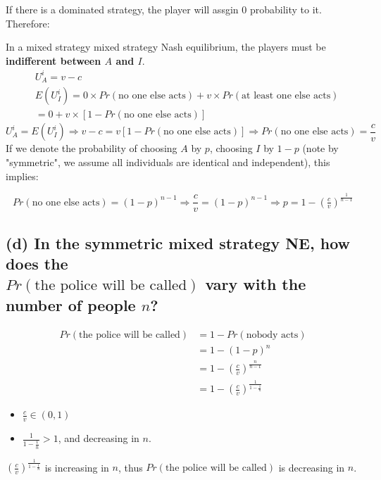 \documentclass{article}
\begin{document}
\begin{mdframed}[backgroundcolor=blue!20,linecolor=white]
If there is a dominated strategy, the player will assgin 0 probability to it. Therefore:
\end{mdframed}

In a mixed strategy mixed strategy Nash equilibrium, the players must be \textbf{indifferent between $A$ and $I$}.
\begin{align*}
& U^i_A = v-c \\  
&E(U^i_I) = 0 \times Pr(\text{no one else acts}) + v \times  Pr(\text{at least one else acts}) \\
&= 0 + v \times [1- Pr(\text{no one else acts})]
\end{align*}
$$U^i_A = E(U^i_I) \Rightarrow v-c = v [1- Pr(\text{no one else acts})]\Rightarrow Pr(\text{no one else acts}) = \frac{c}{v}$$
If we denote the probability of choosing $A$ by $p$, choosing $I$ by $1-p$ (note by "symmetric", we assume all individuals are identical and independent), 
this implies:

$$Pr(\text{no one else acts}) = (1-p)^{n-1} \Rightarrow \frac{c}{v}= (1-p)^{n-1} \Rightarrow  p = 1 - \left( \tfrac{c}{v} \right)^\frac1{n-1}$$ 


\subsection*{(d) In the symmetric mixed strategy NE, how does the \\ $Pr(\text{the police  will  be  called})$ vary with the number of people $n$?}  

\begin{align*}
Pr(\text{the police  will  be  called}) &= 1 - Pr(\text{nobody acts})  \\
&= 1- (1-p)^n \\
&= 1- \left( \tfrac{c}{v} \right)^\frac n{n-1} \\
&= 1- \left( \tfrac{c}{v} \right)^\frac 1{1-\tfrac 1n}
\end{align*}

\begin{itemize}
\item $\tfrac{c}{v} \in (0,1)$
\item $\frac 1{1-\tfrac 1n} > 1$, and decreasing in $n$.
\end{itemize}

$\left( \tfrac{c}{v} \right)^\frac 1{1-\tfrac 1n}$ is increasing in $n$, thus $Pr(\text{the police  will be called})$ is decreasing in $n$.
\end{document}
